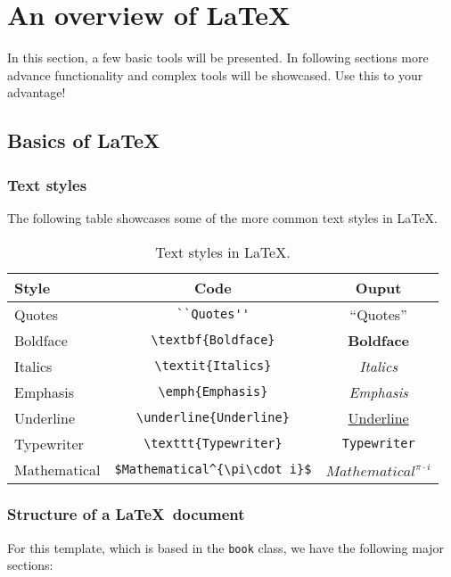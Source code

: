 \chapter{An overview of \LaTeX}

In this section, a few basic tools will be presented. In following sections more advance functionality and complex tools will be showcased. Use this to your advantage!

\section{Basics of \LaTeX}

\subsection{Text styles}

The following table showcases some of the more common text styles in \LaTeX.

\begin{table}[h]
	\centering
	\begin{tabular}{lcc}
	  \toprule
	  Style & Code & Ouput \\
	  \midrule
	  Quotes & \verb|``Quotes''| & ``Quotes'' \\
	  Boldface & \verb|\textbf{Boldface}| & \textbf{Boldface} \\
	  Italics & \verb|\textit{Italics}| & \textit{Italics} \\
	  Emphasis & \verb|\emph{Emphasis}| & \emph{Emphasis} \\
	  Underline & \verb|\underline{Underline}| & \underline{Underline} \\
	  Typewriter & \verb|\texttt{Typewriter}| & \texttt{Typewriter} \\
	  Mathematical & \verb|$Mathematical^{\pi\cdot i}$| & $Mathematical^{\pi\cdot i}$ \\
	  \bottomrule
	\end{tabular}
	\caption{Text styles in \LaTeX.}
	\label{fig:textstyles}
\end{table}

\subsection{Structure of a \LaTeX\ document}

For this template, which is based in the \texttt{book} class, we have the following major sections:

